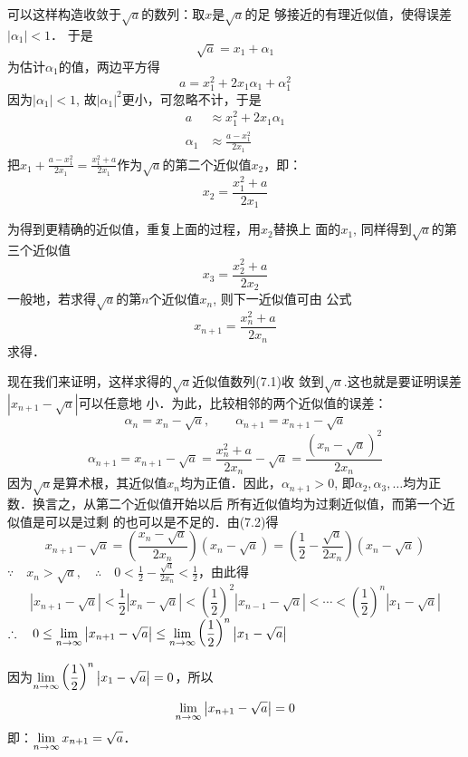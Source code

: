 \begin{solution}
可以这样构造收敛于$\sqrt{a}$的数列：取$x$是$\sqrt{a}$的足
够接近的有理近似值，使得误差$|\alpha_1|<1$．
于是
\[\sqrt{a}=x_1+\alpha_1\]
为估计$\alpha_1$的值，两边平方得
\[a=x^2_1+2x_1\alpha_1+\alpha_1^2\]
因为$|\alpha_1|<1$, 故$|\alpha_1|^2$更小，可忽略不计，于是
\[\begin{split}
    a&\approx x^2_1+2x_1\alpha_1\\
    \alpha_1&\approx \frac{a-x^2_1}{2x_1}
\end{split}\]
把$x_1+\frac{a-x^2_1}{2x_1}=\frac{x^2_1+a}{2x_1}$作为$\sqrt{a}$的第二个近似值$x_2$，即：
\[x_2=\frac{x^2_1+a}{2x_1}\]

为得到更精确的近似值，重复上面的过程，用$x_2$替换上
面的$x_1$, 同样得到$\sqrt{a}$的第三个近似值
\[x_3=\frac{x^2_2+a}{2x_2}\]
一般地，若求得$\sqrt{a}$的第$n$个近似值$x_n$, 则下一近似值可由
公式
\begin{equation}
    x_{n+1}=\frac{x^2_n+a}{2x_n}
\end{equation}
求得．

现在我们来证明，这样求得的$\sqrt{a}$近似值数列(7.1)收
敛到$\sqrt{a}$.这也就是要证明误差$|x_{n+1}-\sqrt{a}|$可以任意地
小．为此，比较相邻的两个近似值的误差：
\[\alpha_n=x_n-\sqrt{a},\qquad \alpha_{n+1}=x_{n+1}-\sqrt{a}\]
\begin{equation}
    \alpha_{n+1}=x_{n+1}-\sqrt{a}=\frac{x^2_n+a}{2x_n}-\sqrt{a}=\frac{\left(x_n-\sqrt{a}\right)^2}{2x_n}
\end{equation}
因为$\sqrt{a}$是算术根，其近似值$x_n$均为正值．因此，$\alpha_{n+1}>0$, 即$\alpha_2,\alpha_3,\ldots$均为正数．换言之，从第二个近似值开始以后
所有近似值均为过剩近似值，而第一个近似值是可以是过剩
的也可以是不足的．由(7.2)得
\[x_{n+1}-\sqrt{a}=\left(\frac{x_n-\sqrt{a}}{2x_n}\right)\left(x_n-\sqrt{a}\right)=\left(\frac{1}{2}-\frac{\sqrt{a}}{2x_n}\right)\left(x_n-\sqrt{a}\right)\]
$\because\quad x_n>\sqrt{a},\quad \therefore\quad 0<\frac{1}{2}-\frac{\sqrt{a}}{2x_n}<\frac{1}{2}$，由此得
\[\left|x_{n+1}-\sqrt{a}\right|<\frac{1}{2}\left|x_n-\sqrt{a}\right|<\left(\frac{1}{2}\right)^2\left|x_{n-1}-\sqrt{a}\right|<\cdots <\left(\frac{1}{2}\right)^n\left|x_1-\sqrt{a}\right|\]
$\therefore\quad 0\le \displaystyle\lim_{n\to\infty} \left|x_{n+1}-\sqrt{a}\right|\le \displaystyle\lim_{n\to\infty}\left(\dfrac{1}{2}\right)^n\left|x_1-\sqrt{a}\right|$

因为$\displaystyle\lim_{n\to\infty}\left(\dfrac{1}{2}\right)^n\left|x_1-\sqrt{a}\right|=0$，所以$$\displaystyle\lim_{n\to\infty}\left|x_{n+1}-\sqrt{a}\right|=0$$
即：$\displaystyle\lim_{n\to\infty} x_{n+1}=\sqrt{a}$．
\end{solution}


